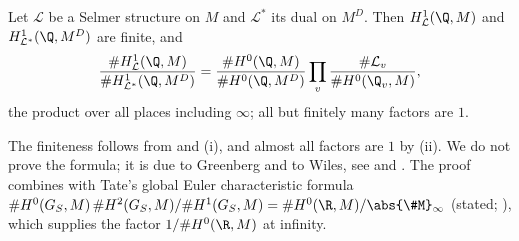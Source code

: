 \begin{theorem}\label{thm:galcoh:greenberg-wiles}
Let $\mathcal L$ be a Selmer structure on $M$ and $\mathcal L^*$ its dual on $M^D$. Then $H^1_{\mathcal L}(\Q,M)$ and $H^1_{\mathcal L^*}(\Q,M^D)$ are finite, and
\[
\frac{\#H^1_{\mathcal L}(\Q,M)}{\#H^1_{\mathcal L^*}(\Q,M^D)}=\frac{\#H^0(\Q,M)}{\#H^0(\Q,M^D)}\prod_v\frac{\#\mathcal L_v}{\#H^0(\Q_v,M)},
\]
the product over all places including $\infty$; all but finitely many factors are $1$.
\end{theorem}

\noindent The finiteness follows from  and (i), and almost all factors are $1$ by
(ii). We do not prove the formula; it is due to Greenberg and to Wiles, see \cite[Section 1]{Wiles95} and
\cite[Section 2]{DDT}. The proof combines  with Tate's global Euler characteristic formula
$\#H^0(G_S,M)\,\#H^2(G_S,M)/\#H^1(G_S,M)=\#H^0(\R,M)/\abs{\#M}_\infty$ (stated; \cite[Chapter I, Section 5]{MilneADT}), which supplies the factor $1/\#H^0(\R,M)$ at
infinity.

